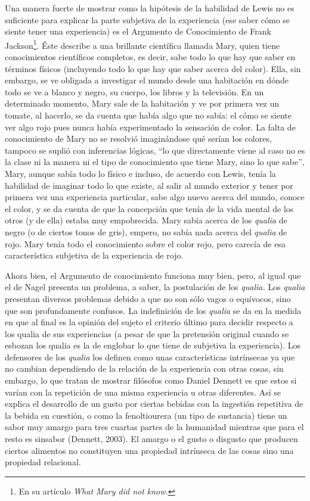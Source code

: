 \documentclass[]{book}
\begin{document}
Una manera fuerte de mostrar como la hipótesis de la habilidad de Lewis
no es suficiente para explicar la parte subjetiva de la experiencia (ese
saber cómo se siente tener una experiencia) es el Argumento de
Conocimiento de Frank Jackson\footnote{En su artículo \emph{What Mary
  did not know.}}. Éste describe a una brillante científica llamada
Mary, quien tiene conocimientos científicos completos, es decir, sabe
todo lo que hay que saber en términos físicos (incluyendo todo lo que
hay que saber acerca del color). Ella, sin embargo, se ve obligada a
investigar el mundo desde una habitación en dónde todo se ve a blanco y
negro, su cuerpo, los libros y la televisión. En un determinado momento,
Mary sale de la habitación y ve por primera vez un tomate, al hacerlo,
se da cuenta que había algo que no sabía: el cómo se siente ver algo
rojo pues nunca había experimentado la sensación de color. La falta de
conocimiento de Mary no se resolvió imaginándose qué serían los colores,
tampoco se suplió con inferencias lógicas, ``lo que directamente viene
al caso no es la clase ni la manera ni el tipo de conocimiento que tiene
Mary, sino lo que sabe'', Mary, aunque sabía todo lo físico e incluso,
de acuerdo con Lewis, tenía la habilidad de imaginar todo lo que existe,
al salir al mundo exterior y tener por primera vez una experiencia
particular, sabe algo nuevo acerca del mundo, conoce el color, y se da
cuenta de que la concepción que tenía de la vida mental de los otros (y
de ella) estaba muy empobrecida. Mary sabía acerca de los \emph{qualia}
de negro (o de ciertos tonos de gris), empero, no sabía nada acerca del
\emph{qualia} de rojo. Mary tenía todo el conocimiento sobre el color
rojo, pero carecía de esa característica subjetiva de la experiencia de
rojo.

Ahora bien, el Argumento de conocimiento funciona muy bien, pero, al
igual que el de Nagel presenta un problema, a saber, la postulación de
los \emph{qualia.} Los \emph{qualia} presentan diversos problemas debido
a que no son sólo vagos o equívocos, sino que son profundamente
confusos. La indefinición de los \emph{qualia} se da en la medida en que
al final es la opinión del sujeto el criterio último para decidir
respecto a los qualia de sus experiencias (a pesar de que la pretensión
original cuando se esbozan los qualia es la de englobar lo que tiene de
subjetiva la experiencia). Los defensores de los \emph{qualia} los
definen como unas características intrínsecas ya que no cambian
dependiendo de la relación de la experiencia con otras cosas, sin
embargo, lo que tratan de mostrar filósofos como Daniel Dennett es que
estos si varían con la repetición de una misma experiencia u otras
diferentes. Así se explica el desarrollo de un gusto por ciertas bebidas
con la ingestión repetitiva de la bebida en cuestión, o como la
fenoltiourera (un tipo de sustancia) tiene un sabor muy amargo para tres
cuartas partes de la humanidad mientras que para el resto es sinsabor
(Dennett, 2003). El amargo o el gusto o disgusto que producen ciertos
alimentos no constituyen una propiedad intrínseca de las cosas sino una
propiedad relacional.
\end{document}
